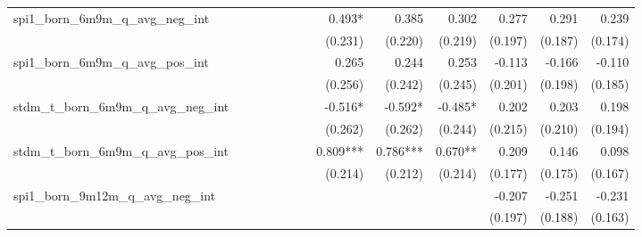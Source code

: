 \begin{tabular}{lrrrrrrrrrrrr}
spi1\_born\_6m9m\_q\_avg\_neg\_int          &              &              &              &              &              &              &       0.493* &        0.385 &        0.302 &        0.277 &        0.291 &        0.239 \\ 
                                            &              &              &              &              &              &              &      (0.231) &      (0.220) &      (0.219) &      (0.197) &      (0.187) &      (0.174) \\ 
spi1\_born\_6m9m\_q\_avg\_pos\_int          &              &              &              &              &              &              &        0.265 &        0.244 &        0.253 &       -0.113 &       -0.166 &       -0.110 \\ 
                                            &              &              &              &              &              &              &      (0.256) &      (0.242) &      (0.245) &      (0.201) &      (0.198) &      (0.185) \\ 
stdm\_t\_born\_6m9m\_q\_avg\_neg\_int       &              &              &              &              &              &              &      -0.516* &      -0.592* &      -0.485* &        0.202 &        0.203 &        0.198 \\ 
                                            &              &              &              &              &              &              &      (0.262) &      (0.262) &      (0.244) &      (0.215) &      (0.210) &      (0.194) \\ 
stdm\_t\_born\_6m9m\_q\_avg\_pos\_int       &              &              &              &              &              &              &     0.809*** &     0.786*** &      0.670** &        0.209 &        0.146 &        0.098 \\ 
                                            &              &              &              &              &              &              &      (0.214) &      (0.212) &      (0.214) &      (0.177) &      (0.175) &      (0.167) \\ 
spi1\_born\_9m12m\_q\_avg\_neg\_int         &              &              &              &              &              &              &              &              &              &       -0.207 &       -0.251 &       -0.231 \\ 
                                            &              &              &              &              &              &              &              &              &              &      (0.197) &      (0.188) &      (0.163) \\ 

\end{tabular}
